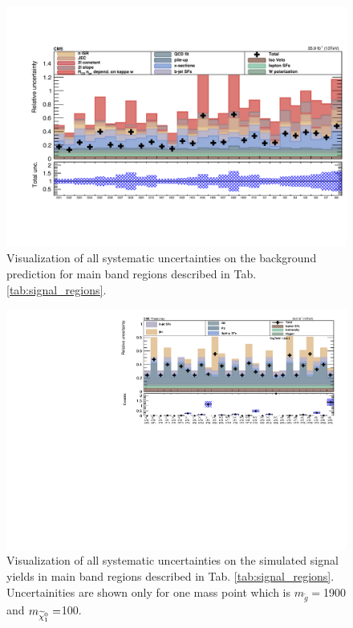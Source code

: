 \begin{figure}[!hbt]
    \begin{center}
  \includegraphics[width=0.8 \textwidth]{Plots/analysis/syst/plots_zerob_kappa_systematics_zerob}
  \caption{ \label{fig:systBKG} Visualization of all systematic uncertainties on the background prediction for main band regions described in Tab. \ref{tab:signal_regions}.}
  \end{center}
\end{figure}
\begin{figure}[!hbt]
    \begin{center}
  \includegraphics[width=0.9 \textwidth]{Plots/analysis/syst/syst_errors_signal_1900_100}
  \caption{ \label{fig:systSig1} Visualization of all systematic uncertainties on the simulated signal yields in main band regions described in Tab. \ref{tab:signal_regions}. Uncertainities are shown only for one mass point which is  $m_{\tilde{g}}=$1900 and $m_{\widetilde{\chi}^0_1}=$100. }
  \end{center}
\end{figure}
